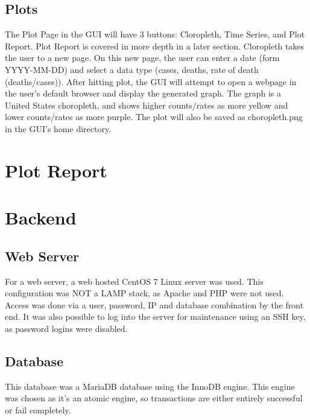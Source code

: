 \documentclass{article}
\begin{document}
\subsection{Plots}
\noindent
The Plot Page in the GUI will have 3 buttons: Cloropleth, Time Series, and Plot Report.  Plot Report is covered in more depth in a later section.
Cloropleth takes the user to a new page.  On this new page, the user can enter a date (form YYYY-MM-DD) and select a data type (cases, deaths, rate of death (deaths/cases)). After hitting plot, the GUI will attempt to open a webpage in the user's default browser and display the generated graph. The graph is a United States choropleth, and shows higher counts/rates as more yellow and lower counts/rates as more purple.  The plot will also be saved as choropleth.png in the GUI's home directory.
\section{Plot Report}

\section{Backend}
\subsection{Web Server}
\noindent
For a web server, a web hosted CentOS 7 Linux server was used. This configuration was NOT a LAMP stack, as Apache and 
PHP were not used. Access was done via a user, password, IP and database combination by the front end. It was also 
possible to log into the server for maintenance using an SSH key, as password logins were disabled.

\subsection{Database}
\noindent
This database was a MariaDB database using the InnoDB engine. This engine was chosen as it's an atomic engine, so
transactions are either entirely successful or fail completely. 
\end{document}
